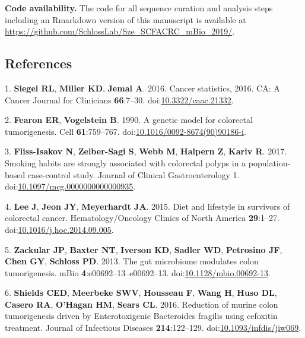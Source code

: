 \documentclass[11pt,]{article}
\begin{document}
\textbf{Code availability.} The code for all sequence curation and
analysis steps including an Rmarkdown version of this manuscript is
available at \url{https://github.com/SchlossLab/Sze_SCFACRC_mBio_2019/}.

\newpage

\hypertarget{references}{%
\subsection{References}\label{references}}

\hypertarget{refs}{}
\leavevmode\hypertarget{ref-Siegel2016}{}%
1. \textbf{Siegel RL}, \textbf{Miller KD}, \textbf{Jemal A}. 2016.
Cancer statistics, 2016. CA: A Cancer Journal for Clinicians
\textbf{66}:7--30.
doi:\href{https://doi.org/10.3322/caac.21332}{10.3322/caac.21332}.

\leavevmode\hypertarget{ref-Fearon1990}{}%
2. \textbf{Fearon ER}, \textbf{Vogelstein B}. 1990. A genetic model for
colorectal tumorigenesis. Cell \textbf{61}:759--767.
doi:\href{https://doi.org/10.1016/0092-8674(90)90186-i}{10.1016/0092-8674(90)90186-i}.

\leavevmode\hypertarget{ref-FlissIsakov2017}{}%
3. \textbf{Fliss-Isakov N}, \textbf{Zelber-Sagi S}, \textbf{Webb M},
\textbf{Halpern Z}, \textbf{Kariv R}. 2017. Smoking habits are strongly
associated with colorectal polyps in a population-based case-control
study. Journal of Clinical Gastroenterology 1.
doi:\href{https://doi.org/10.1097/mcg.0000000000000935}{10.1097/mcg.0000000000000935}.

\leavevmode\hypertarget{ref-Lee2015}{}%
4. \textbf{Lee J}, \textbf{Jeon JY}, \textbf{Meyerhardt JA}. 2015. Diet
and lifestyle in survivors of colorectal cancer. Hematology/Oncology
Clinics of North America \textbf{29}:1--27.
doi:\href{https://doi.org/10.1016/j.hoc.2014.09.005}{10.1016/j.hoc.2014.09.005}.

\leavevmode\hypertarget{ref-Zackular2013}{}%
5. \textbf{Zackular JP}, \textbf{Baxter NT}, \textbf{Iverson KD},
\textbf{Sadler WD}, \textbf{Petrosino JF}, \textbf{Chen GY},
\textbf{Schloss PD}. 2013. The gut microbiome modulates colon
tumorigenesis. mBio \textbf{4}:e00692--13--e00692--13.
doi:\href{https://doi.org/10.1128/mbio.00692-13}{10.1128/mbio.00692-13}.

\leavevmode\hypertarget{ref-DeStefanoShields2016}{}%
6. \textbf{Shields CED}, \textbf{Meerbeke SWV}, \textbf{Housseau F},
\textbf{Wang H}, \textbf{Huso DL}, \textbf{Casero RA}, \textbf{O'Hagan
HM}, \textbf{Sears CL}. 2016. Reduction of murine colon tumorigenesis
driven by Enterotoxigenic Bacteroides fragilis using cefoxitin
treatment. Journal of Infectious Diseases \textbf{214}:122--129.
doi:\href{https://doi.org/10.1093/infdis/jiw069}{10.1093/infdis/jiw069}.
\end{document}
